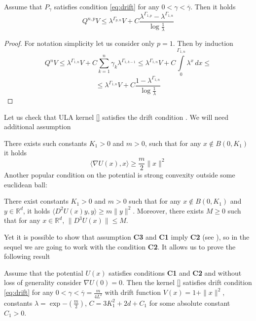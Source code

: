 \documentclass[leqno,11pt,a4paper]{article}
\begin{document}
\begin{lemma}
\label{lem:drift_prod}
 Assume that $P_{\gamma}$ satisfies condition \ref{eq:drift} for any $0 < \gamma < \overline{\gamma}$. Then it holds
$$
Q^{n,p}V \leq \lambda^{\Gamma_{p,n}}V + C\frac{\lambda^{\Gamma_{1,p}} - \lambda^{\Gamma_{1,n}}}{\log{\frac{1}{\lambda}}}
$$ 
\end{lemma}
\begin{proof} For notation simplicity let us consider only $p=1$. Then by induction
$$
Q^{n}V \leq \lambda^{\Gamma_{1,n}}V + C \sum\limits_{k=1}^{n}\gamma_k \lambda^{\Gamma_{1,k-1}} \leq \lambda^{\Gamma_{1,n}}V + C \int\limits_{0}^{\Gamma_{1,n}}\lambda^{x}\,dx \leq
$$
$$
\leq \lambda^{\Gamma_{1,n}}V + C\frac{1-\lambda^{\Gamma_{1,n}}}{\log{\frac{1}{\lambda}}}
$$
\end{proof}
Let us check that ULA kernel \ref{} satisfies the drift condition \label{eq:drift}. We will need additional assumption
\par
[{\bf C2}] There exists such constants $K_1 > 0$ and $m > 0$, such that for any $x \notin B(0,K_1)$ it holds
$$
\langle \nabla U(x), x \rangle \geq \frac{m}{2}\|x\|^2
$$
Another popular condition on the potential is strong convexity outside some euclidean ball:
\par
[{\bf C3}] There exist constants $K_1 > 0$ and $m > 0$ such that for any $x \notin B(0,K_1)$ and $y \in \mathbb{R}^d$, it holds $\langle D^2U(x)y,y\rangle \geq m\|y\|^2$. Moreover, there exists $M \geq 0$ such that for any $x \in \mathbb{R}^d$, $\|D^3U(x)\| \leq M$.
\par
Yet it is possible to show that assumption {\bf C3} and {\bf C1} imply {\bf C2} (see \cite[Lemma~14]{brosse:2018:diffusion}), so in the sequel we are going to work with the condition {\bf C2}. It allows us to prove the following result

\begin{lemma} Assume that the potential $U(x)$ satisfies conditions {\bf C1} and {\bf C2} and without loss of generality consider $\nabla U(0) = 0$. Then the kernel \ref{} satisfies drift condition \ref{eq:drift} for any $0 < \gamma < \overline{\gamma} = \frac{m}{4L^2}$ with drift function $V(x) = 1 + \|x\|^2$, constants $\lambda = \exp{-\left(\frac{m}{2}\right)}$, $C = 3K_1^2 + 2d + C_1$ for some absolute constant $C_1 > 0$.
\end{lemma}
\end{document}
